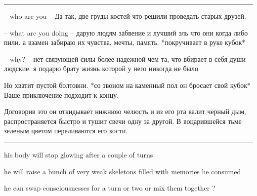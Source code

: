 \documentclass[a5paper,11pt]{book}
\newenvironment{boxed}
{\em\noindent\rule[1ex]{\linewidth}{0.1pt}\linebreak\indent}
{\par\noindent\rule[1ex]{\linewidth}{0.1pt}}
\begin{document}
\begin{multicols}{2}
\begin{enumerate}
\begin{boxed}
-- who are you -- Да так, две груды костей что решили проведать старых друзей. 

-- what are you doing -- дарую людям забвение и лучший эль что они когда либо пили. а взамен забираю их чувства, мечты, память. *покручивает в руке кубок*

-- why? -- нет связующей силы более надежной чем та, что вбирает в себя души людские. я подарю брату жизнь которой у него никогда не было

Но хватит пустой болтовни. *со звоном на каменный пол он бросает свой кубок* Ваше приключение подходит к концу. 

Договорив это он откидывает нижнюю челюсть и из его рта валит черный дым, распространяется быстро и тушит свечи одну за другой. В воцарившейся тьме зеленым цветом переливаются его кости.
\end{boxed}

his body will stop glowing after a couple of turns

he will raise a bunch of very weak skeletons filled with memories he consumed

he can swap consciousnesses for a turn or two or mix them together ?

\end{enumerate}












\end{multicols}
\end{document}
